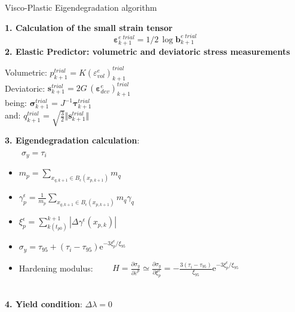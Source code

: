 \documentclass[applsci,journal,article,submit,moreauthors,pdftex]{Definitions/mdpi}
\begin{document}
\begin{algorithm}
\caption{Visco-Plastic Eigendegradation algorithm}\label{alg1}
\begin{algorithmic}
\State \textbf{1. Calculation of the small strain tensor}
$$
\boldsymbol{\varepsilon}^{e\; trial}_{k+1}=1/2\,\log\mathbf{b}^{e\; trial}_{k+1}
$$
\State
\textbf{2. Elastic Predictor: volumetric and deviatoric stress measurements}
\begin{center}
Volumetric:  $p^{trial}_{k+1}=K \left(\varepsilon^{e}_{vol}\right)^{trial}_{k+1}$\\
Deviatoric:  $
\mathbf{s}^{trial}_{k+1}=2G\,\left(\boldsymbol{\varepsilon}^{e}_{dev}\right)^{trial}_{k+1}
$\\
\vspace{0.3cm}
being: $
\boldsymbol{\sigma}^{trial}_{k+1}=J^{-1}\boldsymbol{\tau}^{trial}_{k+1}
$\\
\vspace{0.3cm}
and:
$q^{trial}_{k+1}=\sqrt{\frac{3}{2}} \Vert \boldsymbol{s}^{trial}_{k+1} \Vert$
\vspace{0.15cm}
\end{center}
\textbf{3. Eigendegradation calculation}:\\
 $\qquad \sigma_y=\tau_i$
\ELSE
\begin{itemize}
\item
$
m_{p}=\sum_{x_{q,k+1}\in B_\epsilon (x_{p,k+1})}m_q
$
\vspace{0.15cm}
\item
$
\gamma^{\epsilon}_{p}=\frac{1}{m_{p}}\sum_{x_{q,k+1}\in B_\epsilon (x_{p,k+1})}m_q \gamma_{q}
$
\vspace{0.15cm}
\item
$
\xi^{\epsilon}_{p}=\sum^{k+1}_{k(t_{p0})} \left|\Delta\gamma^{\epsilon}(x_{p,k})\right| 
$
\vspace{0.15cm}
\item
$
\sigma_y=\tau_{95}+\left(\tau_{i}-\tau_{95}\right) \mathrm{e}^{-3 \xi^{\epsilon}_{p} / \xi_{95}}
$
\vspace{0.15cm}
\item Hardening modulus:
$
\qquad H=\frac{\partial \sigma_y}{\partial\overline{\varepsilon}^p} \simeq \frac{\partial \sigma_y}{\partial \xi^{\epsilon}_{p}} = -\frac{3\left(\tau_{i}-\tau_{95}\right)}{\xi_{95}} \mathrm{e}^{-3 \xi^{\epsilon}_{p} / \xi_{95}}
$
\end{itemize}
\ENDIF
\\
\vspace{0.3cm}
\textbf{4. Yield condition}: $\Delta\lambda=0$\\

\end{algorithmic}
\end{algorithm}
\end{document}
